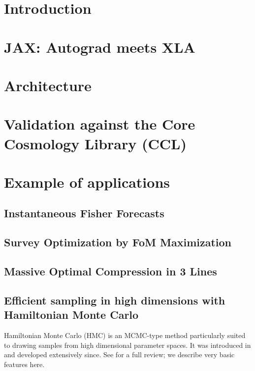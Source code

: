 \documentclass[final,5p,times,twocolumn,authoryear]{elsarticle}
\begin{document}


\section{Introduction}



\section{JAX: Autograd meets XLA}


\section{Architecture}


\section{Validation against the Core Cosmology Library (CCL)} 

\section{Example of applications}

\subsection{Instantaneous Fisher Forecasts}


\subsection{Survey Optimization by FoM Maximization}


\subsection{Massive Optimal Compression in 3 Lines}

\subsection{Efficient sampling in high dimensions with Hamiltonian Monte Carlo}

Hamiltonian Monte Carlo (HMC) is an MCMC-type method particularly suited to drawing
samples from high dimensional parameter spaces.  It was introduced in \citep{1987PhLB..195..216D}
and developed extensively since.  See \citet{betancourt} for a full review; we describe
very basic features here.
\end{document}
